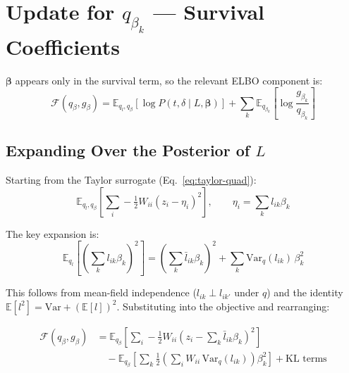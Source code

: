 \documentclass[11pt]{article}
\newcommand{\lbar}[2]{\bar{l}_{#1#2}}
\begin{document}
\section{Update for \texorpdfstring{$q_{\beta_k}$}{q(betak)} --- Survival Coefficients}
\label{sec:beta}

$\bm{\beta}$ appears only in the survival term, so the relevant ELBO
component is:
\begin{equation}
  \mathcal{F}(q_\beta, g_\beta) =
  \mathbb{E}_{q_l, q_\beta}\!\left[\log P(t,\delta \mid L,\bm{\beta})\right]
  + \sum_k \mathbb{E}_{q_{\beta_k}}\!\left[\log\frac{g_{\beta_k}}{q_{\beta_k}}\right]
\end{equation}

\subsection{Expanding Over the Posterior of $L$}

Starting from the Taylor surrogate (Eq.~\ref{eq:taylor-quad}):
\begin{equation}
  \mathbb{E}_{q_l, q_\beta}\left[\sum_i -\tfrac{1}{2}W_{ii}(z_i - \eta_i)^2\right],
  \qquad \eta_i = \sum_k l_{ik}\beta_k
\end{equation}

The key expansion is:
\begin{equation}\label{eq:sq-expansion}
  \mathbb{E}_{q_l}\!\left[\left(\sum_k l_{ik}\beta_k\right)^{\!2}\right]
  = \left(\sum_k \lbar{i}{k}\beta_k\right)^{\!2}
    + \sum_k \mathrm{Var}_q(l_{ik})\,\beta_k^2
\end{equation}

This follows from mean-field independence ($l_{ik} \perp l_{ik'}$ under $q$)
and the identity $\mathbb{E}[l^2] = \mathrm{Var} + (\mathbb{E}[l])^2$.
Substituting into the objective and rearranging:

\begin{align}
  \mathcal{F}(q_\beta, g_\beta)
  &= \mathbb{E}_{q_\beta}\!\left[\sum_i -\tfrac{1}{2}W_{ii}
     \!\left(z_i - \sum_k \lbar{i}{k}\beta_k\right)^{\!2}\right] \nonumber \\
  &\quad - \mathbb{E}_{q_\beta}\!\left[\sum_k \frac{1}{2}
     \!\left(\sum_i W_{ii}\,\mathrm{Var}_q(l_{ik})\right)\!\beta_k^2\right]
  + \text{KL terms}
  \label{eq:beta-obj}
\end{align}
\end{document}
